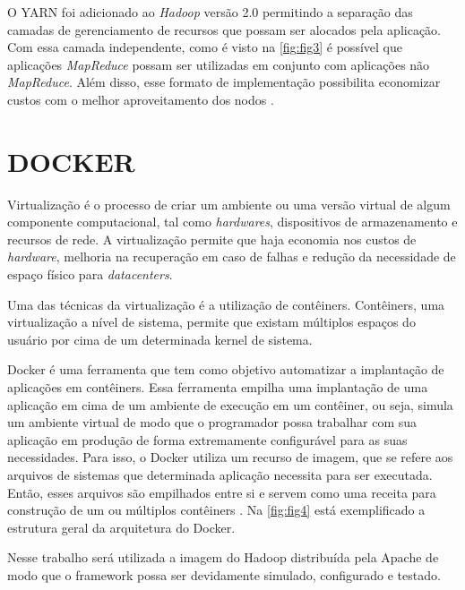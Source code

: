 O YARN foi adicionado ao \textit{Hadoop} versão 2.0 permitindo a separação das camadas de gerenciamento de recursos que possam ser alocados pela aplicação. Com essa camada independente, como é visto na \autoref{fig:fig3} é possível que aplicações \textit{MapReduce} possam ser utilizadas em conjunto com aplicações não \textit{MapReduce}. Além disso, esse formato de implementação possibilita economizar custos com o melhor aproveitamento dos nodos \cite{KobylinskaMartins14}. 


\newpage
\section{DOCKER} \label{sec:docker}

Virtualização é o processo de criar um ambiente ou uma versão virtual de algum componente computacional, tal como \textit{hardwares}, dispositivos de armazenamento e recursos de rede. A virtualização permite que haja economia nos custos de \textit{hardware}, melhoria na recuperação em caso de falhas e redução da necessidade de espaço físico para \textit{datacenters}. 

Uma das técnicas da virtualização é a utilização de contêiners. Contêiners, uma virtualização a nível de sistema, permite que existam múltiplos espaços do usuário por cima de um determinada kernel de sistema. 

Docker é uma ferramenta que tem como objetivo automatizar a implantação de aplicações em contêiners. Essa ferramenta empilha uma implantação de uma aplicação em cima de um ambiente de execução em um contêiner, ou seja, simula um ambiente virtual de modo que o programador possa trabalhar com sua aplicação em produção de forma extremamente configurável para as suas necessidades. Para isso, o Docker utiliza um recurso de imagem, que se refere aos arquivos de sistemas que determinada aplicação necessita para ser executada. Então, esses arquivos são empilhados entre si e servem como uma receita para construção de um ou múltiplos contêiners \cite{DockerBook14}. Na \autoref{fig:fig4} está exemplificado a estrutura geral da arquitetura do Docker.

Nesse trabalho será utilizada a imagem do Hadoop distribuída pela Apache de modo que o framework possa ser devidamente simulado, configurado e testado.

